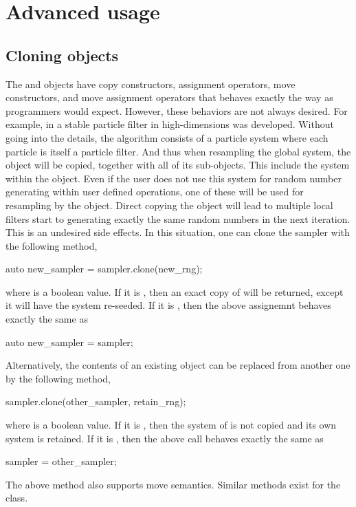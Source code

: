 \chapter{Advanced usage}
\label{chap:Advanced usage}

\section{Cloning objects}
\label{sec:Cloning objects}

The  and  objects have copy
constructors, assignment operators, move constructors, and move assignment
operators that behaves exactly the way as \cpp programmers would expect.
However, these behaviors are not always desired. For example, in
\textcite{stpf} a stable particle filter in high-dimensions was developed.
Without going into the details, the algorithm consists of a particle system
where each particle is itself a particle filter. And thus when resampling the
global system, the  object will be copied, together with
all of its sub-objects. This include the \rng system within the
 object. Even if the user does not use this \rng system
for random number generating within user defined operations, one of these \rng
will be used for resampling by the  object. Direct
copying the  object will lead to multiple local filters
start to generating exactly the same random numbers in the next iteration. This
is an undesired side effects. In this situation, one can clone the sampler with
the following method,
\begin{cppcode}
  auto new_sampler = sampler.clone(new_rng);
\end{cppcode}
where  is a boolean value. If it is , then
an exact copy of  will be returned, except it will have the
\rng system re-seeded. If it is , then the above assignemnt
behaves exactly the same as
\begin{cppcode}
  auto new_sampler = sampler;
\end{cppcode}
Alternatively, the contents of an existing  object can be
replaced from another one by the following method,
\begin{cppcode}
  sampler.clone(other_sampler, retain_rng);
\end{cppcode}
where  is a boolean value. If it is ,
then the \rng system of  is not copied and its own
\rng system is retained. If it is , then the above call
behaves exactly the same as
\begin{cppcode}
  sampler = other_sampler;
\end{cppcode}
The above method also supports move semantics. Similar 
methods exist for the  class.

